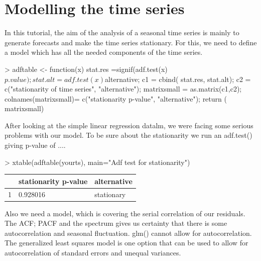 \documentclass[11pt, a4paper]{article} %
\begin{document}
\section{Modelling the time series}
In this tutorial, the aim of the analysis of a seasonal time series is mainly  to generate forecasts  and make the time series stationary. For this, we need to define a model which has all the needed components of the time series. 

\begin{Schunk}
\begin{Sinput}
> adftable <- function(x) {
 stat.res =signif(adf.test(x)$p.value);
 stat.alt = adf.test(x)$alternative;
 c1 = cbind( stat.res, stat.alt);
 c2 = c("stationarity of time series",
         "alternative");
 matrixsmall = as.matrix(c1,c2);
 colnames(matrixsmall)= c("stationarity p-value",
         "alternative");
 return ( matrixsmall)
 }
\end{Sinput}
\end{Schunk}

After looking at the simple linear regression datalm, we were facing some serious problems with our model. To be sure about the stationarity we run an adf.test() giving p-value of .... 

\begin{Schunk}
\begin{Sinput}
> xtable(adftable(yourts), main="Adf test for stationarity")
\end{Sinput}
\begin{Soutput}
\begin{table}[ht]
\centering
\begin{tabular}{rll}
  \hline
 & stationarity p-value & alternative \\ 
  \hline
1 & 0.928016 & stationary \\ 
   \hline
\end{tabular}
\end{table}
\end{Soutput}
\end{Schunk}

Also we need a model, which is covering the serial correlation of our residuals. The ACF; PACF and the spectrum gives us certainty that there is some autocorrelation and seasonal fluctuation. glm() cannot allow for autocorrelation. The generalized least squares  model is one option that can be used to allow for autocorrelation of standard errors and unequal variances. 
\end{document}
